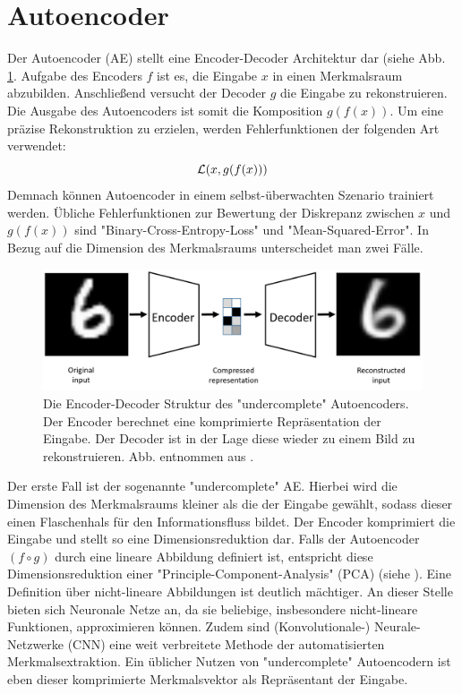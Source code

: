 \section{Autoencoder}\label{sec:autoencoder}
Der Autoencoder (AE) stellt eine Encoder-Decoder Architektur dar (siehe Abb. \ref{fig:ae_model}. Aufgabe des Encoders $f$ ist es, die Eingabe $x$ in einen Merkmalsraum abzubilden. Anschließend versucht der Decoder $g$ die Eingabe zu rekonstruieren. Die Ausgabe des Autoencoders ist somit die Komposition $g(f(x))$. Um eine präzise Rekonstruktion zu erzielen, werden Fehlerfunktionen der folgenden Art verwendet:
\begin{equation}
  \mathcal{L}(x, g(f(x)))
\end{equation}
Demnach können Autoencoder in einem selbst-überwachten Szenario trainiert werden. Übliche Fehlerfunktionen zur Bewertung der Diskrepanz zwischen $x$ und $g(f(x))$ sind "Binary-Cross-Entropy-Loss" und "Mean-Squared-Error". In Bezug auf die Dimension des Merkmalsraums unterscheidet man zwei Fälle. \\
\begin{figure}[hbt]
\centering
  \includegraphics[width=.8\textwidth]{gfx/literature/autoencoder}
  \caption{Die Encoder-Decoder Struktur des "undercomplete" Autoencoders. Der Encoder berechnet eine komprimierte Repräsentation der Eingabe. Der Decoder ist in der Lage diese wieder zu einem Bild zu rekonstruieren. Abb. entnommen aus \cite{LopezPinaya2019}.}
  \label{fig:ae_model}
\end{figure}
Der erste Fall ist der sogenannte "undercomplete" AE. Hierbei wird die Dimension des Merkmalsraums kleiner als die der Eingabe gewählt, sodass dieser einen Flaschenhals für den Informationsfluss bildet. Der Encoder komprimiert die Eingabe und stellt so eine Dimensionsreduktion dar. Falls der Autoencoder $(f \circ g)$ durch eine lineare Abbildung definiert ist, entspricht diese Dimensionsreduktion einer "Principle-Component-Analysis" (PCA) (siehe \cite{ladjal2019pcalike}). Eine Definition über nicht-lineare Abbildungen ist deutlich mächtiger. An dieser Stelle bieten sich Neuronale Netze an, da sie beliebige, insbesondere nicht-lineare Funktionen, approximieren können. Zudem sind (Konvolutionale-) Neurale-Netzwerke (CNN) eine weit verbreitete Methode der automatisierten Merkmalsextraktion. Ein üblicher Nutzen von "undercomplete" Autoencodern ist eben dieser komprimierte Merkmalsvektor als Repräsentant der Eingabe.\\
